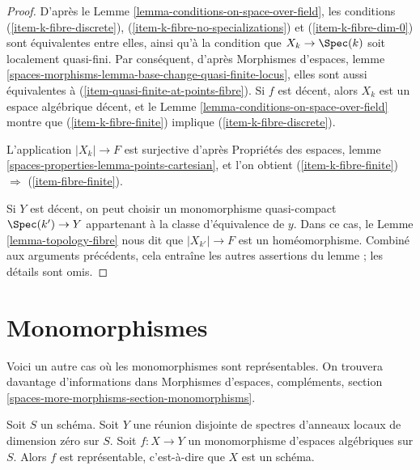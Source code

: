 \begin{proof}
D'après le Lemme \ref{lemma-conditions-on-space-over-field}, les conditions
(\ref{item-k-fibre-discrete}),
(\ref{item-k-fibre-no-specializations}) et (\ref{item-k-fibre-dim-0})
sont équivalentes entre elles, ainsi qu'à la condition que
$X_k \to \Spec(k)$ soit localement quasi-fini.
Par conséquent, d'après Morphismes d'espaces, lemme
\ref{spaces-morphisms-lemma-base-change-quasi-finite-locus},
elles sont aussi équivalentes à (\ref{item-quasi-finite-at-points-fibre}).
Si $f$ est décent, alors $X_k$ est un espace algébrique décent, et le
Lemme \ref{lemma-conditions-on-space-over-field}
montre que (\ref{item-k-fibre-finite}) implique
(\ref{item-k-fibre-discrete}).

\medskip\noindent
L'application $|X_k| \to F$ est surjective d'après
Propriétés des espaces, lemme
\ref{spaces-properties-lemma-points-cartesian},
et l'on obtient
(\ref{item-k-fibre-finite}) $\Rightarrow$ (\ref{item-fibre-finite}).

\medskip\noindent
Si $Y$ est décent, on peut choisir un monomorphisme quasi-compact
$\Spec(k') \to Y$ appartenant à la classe d'équivalence de $y$. Dans ce cas,
le Lemme \ref{lemma-topology-fibre}
nous dit que $|X_{k'}| \to F$ est un homéomorphisme.
Combiné aux arguments précédents, cela entraîne les autres assertions du
lemme ; les détails sont omis.
\end{proof}







\section{Monomorphismes}
\label{section-monomorphisms}

\noindent
Voici un autre cas où les monomorphismes sont représentables.
On trouvera davantage d'informations dans Morphismes d'espaces, compléments,
section \ref{spaces-more-morphisms-section-monomorphisms}.

\begin{lemma}
\label{lemma-monomorphism-toward-disjoint-union-dim-0-rings}
Soit $S$ un schéma. Soit $Y$ une réunion disjointe de spectres d'anneaux
locaux de dimension zéro sur $S$.
Soit $f : X \to Y$ un monomorphisme d'espaces algébriques sur $S$.
Alors $f$ est représentable, c'est-à-dire que $X$ est un schéma.
\end{lemma}

